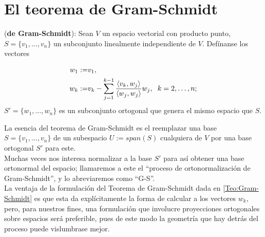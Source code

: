 \section{El teorema de Gram-Schmidt}

\begin{teo} \label{Teo:Gram-Schmidt}
(\textbf{de Gram-Schmidt}): Sean $V$ un espacio vectorial
con producto punto, $S=\{ v_{1}, \ldots ,v_{n} \}$ un
subconjunto linealmente independiente de $V$. 
Defínanse los vectores

\[
\begin{split}
w_{1}:= & v_{1}, \\
w_{k} := & v_{k} - \sum\limits_{j=1}^{k-1}
\frac{\langle v_{k} , w_{j} \rangle}{
\langle w_{j} , w_{j} \rangle}  w_{j},
\hspace{0.2cm} k=2, \ldots ,n;
\end{split}
\]
\noindent
$S'=\{ w_{1}, \ldots , w_{n} \}$ es un subconjunto
ortogonal que genera el mismo espacio que $S$. \TODO{[Friedberg]}
\end{teo}


La esencia del teorema de Gram-Schmidt es el reemplazar una base
$S=\{ v_{1}, \ldots ,v_{n} \}$ de un subespacio 
$U := span(S)$ cualquiera de $V$ 
por una base ortogonal $S'$ para este. \\
Muchas veces nos interesa normalizar a la base $S'$
para así obtener una base ortonormal del espacio; llamaremos
a este el ``proceso de ortonormalización de Gram-Schmidt'',
y lo abreviaremos como ``G-S''.  \\

La ventaja de la formulación del Teorema
de Gram-Schmidt dada en \ref{Teo:Gram-Schmidt}
es que esta
da explícitamente la forma de calcular a los
vectores $w_{k}$, pero,
para nuestros fines, una formulación que
involucre proyecciones ortogonales sobre espacios
será preferible, pues de este modo la geometría
que hay detrás del proceso puede
vislumbrase mejor. 


